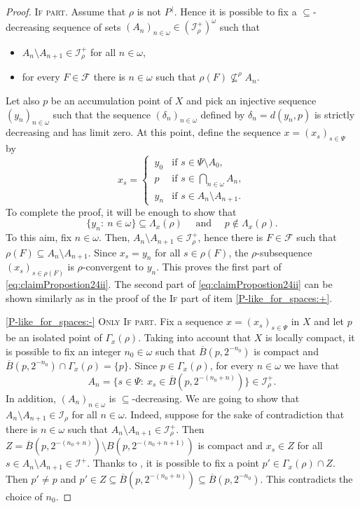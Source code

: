 \documentclass{amsart}
\theoremstyle{plain}
\theoremstyle{definition}
\theoremstyle{remark}
\newcommand{\cF}{\mathcal{F}}
\newcommand{\cI}{\mathcal{I}}
\newcommand{\I}{\cI}
\begin{document}
\begin{proof}
\textsc{If part.} Assume that $\rho$ is not $P^{\,|}$. Hence it is possible to fix a $\subseteq$-decreasing sequence of sets $(A_n)_{n\in\omega}\in (\I_{\rho}^+)^\omega$ such that
\begin{itemize}
    \item $A_n\setminus A_{n+1}\in\I^+_\rho$ for all $n\in\omega$,
    \item for every $F\in\cF$ there is $n\in\omega$ such that $\rho(F)\not\subseteq^\rho A_n$.
\end{itemize}  
Let also $p$ be an accumulation point of $X$ and pick an injective sequence $(y_n)_{n\in\omega}$ such that the sequence $(\delta_n)_{n\in\omega}$ defined by $\delta_n=d(y_n,p)$ is strictly decreasing and has limit zero. At this point, define the sequence $x=(x_s)_{s\in\Psi}$ by 
\begin{equation*}
x_{s}=\begin{cases}
    \,y_0 &\text{if }s\in\Psi\setminus A_0,\\
    \,p &\text{if }s\in\bigcap_{n\in\omega}A_n,\\
    \,y_n &\text{if }s\in A_n\setminus A_{n+1}.
\end{cases}
\end{equation*}
To complete the proof, it will be enough to show that 
\begin{equation}\label{eq:claimPropostion24ii}
\{y_n:\ n\in\omega\}\subseteq\Lambda_x(\rho)
\quad \text{ and }\quad 
p\notin\Lambda_x(\rho).
\end{equation}
To this aim, fix $n \in \omega$. 
Then, $A_n\setminus A_{n+1}\in\I^+_\rho$, hence there is $F\in\cF$ such that $\rho(F)\subseteq A_n\setminus A_{n+1}$. Since $x_s=y_n$ for all $s\in\rho(F)$, the $\rho$-subsequence $(x_s)_{s\in\rho(F)}$ is $\rho$-convergent to $y_n$. This proves the first part of \eqref{eq:claimPropostion24ii}. The second part of \eqref{eq:claimPropostion24ii} 
can be shown similarly as in the proof of the \textsc{If} part of item \ref{P-like_for_spaces:+}.


\ref{P-like_for_spaces:-} 
\textsc{Only If part.} 
Fix a sequence $x=(x_s)_{s\in\Psi}$ in $X$ and let $p$ be an isolated point of $\Gamma_x(\rho)$. Taking into account that $X$ is locally compact, it is possible to fix an integer $n_0\in\omega$ such that $\overline{B}(p,2^{-n_0})$ is compact and $\overline{B}(p,2^{-n_0})\cap\Gamma_x(\rho)=\{p\}$. Since $p\in\Gamma_x(\rho)$, 
for every $n\in\omega$ 
we have that 
\begin{equation*}
A_n=\{s\in\Psi:\ x_s\in \overline{B}(p,2^{-(n_0+n)})\}\in\I^+_\rho.
\end{equation*}
In addition, $(A_n)_{n\in\omega}$ is $\subseteq$-decreasing. We are going to show that $A_n\setminus A_{n+1}\in\I_\rho$ for all $n\in\omega$. Indeed, suppose for the sake of contradiction that there is $n\in\omega$ such that $A_n\setminus A_{n+1}\in \I_\rho^+$.
Then $Z=\overline{B}(p,2^{-(n_0+n)})\setminus B(p,2^{-(n_0+n+1)})$ is compact and $x_s\in Z$ for all $s\in A_n\setminus A_{n+1}\in\I^+$. Thanks to 
\cite[Lemma 3.1(vi)]{MR3920799}, 
it is possible to fix a point  $p'\in\Gamma_x(\rho)\cap Z$. Then $p'\neq p$ and $p'\in Z\subseteq \overline{B}(p,2^{-(n_0+n)})\subseteq \overline{B}(p,2^{-n_0})$. This contradicts the choice of $n_0$. 


\end{proof}
\end{document}
